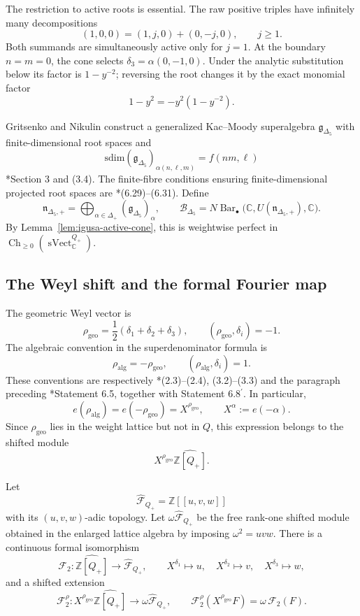 \documentclass[11pt,reqno]{amsart}
\theoremstyle{definition}
\theoremstyle{remark}
\providecommand{\sdim}{\mathrm{sdim}}
\newcommand{\Barc}{\operatorname{Bar}}
\begin{document}
The restriction to active roots is essential.  The raw positive triples
have infinitely many decompositions
\[
 (1,0,0)=(1,j,0)+(0,-j,0),\qquad j\ge1.
\]
Both summands are simultaneously active only for \(j=1\).  At the
boundary \(n=m=0\), the cone selects
\(\delta_3=\alpha(0,-1,0)\).  Under the analytic substitution below its
factor is \(1-y^{-2}\); reversing the root changes it by the exact
monomial factor
\[
 1-y^2=-y^2(1-y^{-2}).
\]

Gritsenko and Nikulin construct a generalized Kac--Moody
superalgebra \(\mathfrak g_{\Delta_5}\) with finite-dimensional root
spaces and
\[
 \sdim(\mathfrak g_{\Delta_5})_{\alpha(n,\ell,m)}
 =f(nm,\ell)
\]
\cite{GN97}*{Section 3 and (3.4)}.  The finite-fibre conditions ensuring
finite-dimensional projected root spaces are
\cite{GN97}*{(6.29)--(6.31)}.  Define
\[
 \mathfrak n_{\Delta_5,+}
 =\bigoplus_{\alpha\in\Delta_+}
   (\mathfrak g_{\Delta_5})_\alpha,\qquad
 \mathcal B_{\Delta_5}
 =N\Barc_\bullet\bigl(
   \mathbb C,U(\mathfrak n_{\Delta_5,+}),\mathbb C\bigr).
\]
By Lemma~\ref{lem:igusa-active-cone}, this is weightwise perfect in
\(\operatorname{Ch}_{\ge0}
(\operatorname{sVect}_{\mathbb C}^{Q_+})\).

\subsection{The Weyl shift and the formal Fourier map}

The geometric Weyl vector is
\[
 \rho_{\mathrm{geo}}
 =\frac12(\delta_1+\delta_2+\delta_3),\qquad
 (\rho_{\mathrm{geo}},\delta_i)=-1.
\]
The algebraic convention in the superdenominator formula is
\[
 \rho_{\mathrm{alg}}=-\rho_{\mathrm{geo}},\qquad
 (\rho_{\mathrm{alg}},\delta_i)=1.
\]
These conventions are respectively
\cite{GN97}*{(2.3)--(2.4), (3.2)--(3.3)} and the paragraph preceding
\cite{GN97}*{Statement 6.5, together with Statement
6.8\(^{\prime}\)}.  In particular,
\[
 e(\rho_{\mathrm{alg}})=e(-\rho_{\mathrm{geo}})
 =X^{\rho_{\mathrm{geo}}},\qquad X^\alpha:=e(-\alpha).
\]
Since \(\rho_{\mathrm{geo}}\) lies in the weight lattice but not in
\(Q\), this expression belongs to the shifted module
\[
 X^{\rho_{\mathrm{geo}}}\widehat{\mathbb Z[Q_+]}.
\]

Let
\[
 \widehat{\mathscr F}_{Q_+}=\mathbb Z[[u,v,w]]
\]
with its \((u,v,w)\)-adic topology.  Let
\(\omega\widehat{\mathscr F}_{Q_+}\) be the free rank-one shifted
module obtained in the enlarged lattice algebra by imposing
\(\omega^2=uvw\).  There is a continuous formal isomorphism
\[
 \mathcal F_2:\widehat{\mathbb Z[Q_+]}
 \longrightarrow\widehat{\mathscr F}_{Q_+},
 \qquad
 X^{\delta_1}\mapsto u,\quad
 X^{\delta_2}\mapsto v,\quad
 X^{\delta_3}\mapsto w,
\]
and a shifted extension
\[
 \mathcal F_2^\rho:
 X^{\rho_{\mathrm{geo}}}\widehat{\mathbb Z[Q_+]}
 \longrightarrow\omega\widehat{\mathscr F}_{Q_+},
 \qquad
 \mathcal F_2^\rho(X^{\rho_{\mathrm{geo}}}F)
 =\omega\,\mathcal F_2(F).
\]
\end{document}
